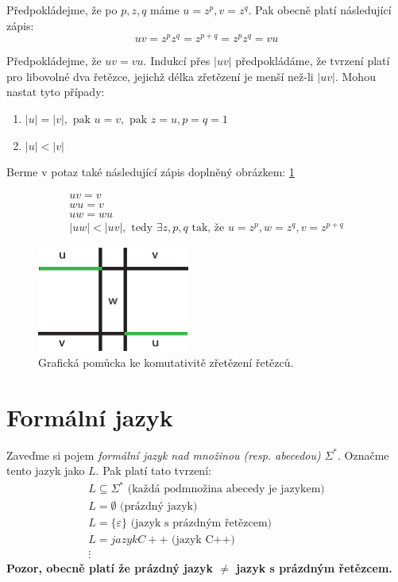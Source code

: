 \documentclass[10pt, a4paper, titlepage]{article}
\theoremstyle{note}
\begin{document}
\begin{itemize}
Předpokládejme, že po $p, z, q$ máme $u = z^{p}, v = z^{q}$. Pak obecně platí následující zápis:
$$
uv = z^{p}z^{q} = z^{p+q} = z^{p} z^{q} = vu
$$

Předpokládejme, že $uv = vu$. Indukcí přes $|uv|$ předpokládáme, že tvrzení platí pro libovolné dva řetězce, jejichž délka zřetězení je menší
než-li $|uv|$. Mohou nastat tyto případy:
\begin{enumerate}
\item
$|u| = |v|, \text{ pak } u = v, \text{ pak } z = u, p = q = 1$

\item
$|u| < |v|$
\end{enumerate}

Berme v potaz také následující zápis doplněný obrázkem: \ref{obr-1}

\begin{gather*}
uv = v \\
wu = v \\
uw = wu \\
|uw| < |uv|, \text{ tedy } \exists z, p, q  \text{ tak, že } u = z^{p}, w = z^{q}, v = z^{p+q}
\end{gather*}

\begin{figure}[ht]
\centering\includegraphics[width=5cm]{dukaz-1.eps}
\caption{Grafická pomůcka ke komutativitě zřetězení řetězců.}\label{obr-1}
\end{figure}
\end{itemize}

\section{Formální jazyk}
Zaveďme si pojem \emph{formální jazyk nad množinou (resp. abecedou)} $\Sigma^{*}$. Označme tento jazyk jako $L$. Pak platí tato tvrzení:
\begin{gather*}
L \subseteq \Sigma^{*} \text{ (každá podmnožina abecedy je jazykem)} \\
L = \emptyset \text{ (prázdný jazyk)} \\
L = \lbrace \varepsilon \rbrace \text{ (jazyk s prázdným řetězcem)} \\
L = jazyk C++ \text{ (jazyk C++)} \\
\vdots
\end{gather*}
\textbf{Pozor, obecně platí že prázdný jazyk $\neq$ jazyk s prázdným řetězcem.}
	
\end{document}
